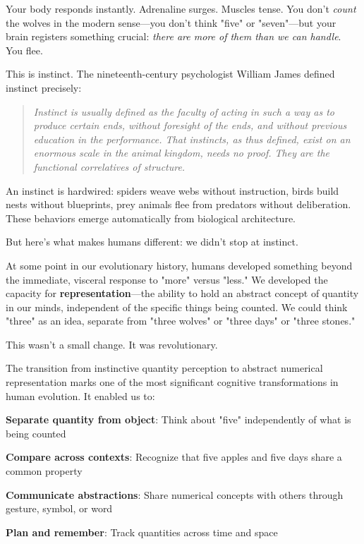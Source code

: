 Your body responds instantly. Adrenaline surges. Muscles tense. You don't \textit{count} the wolves in the modern sense—you don't think "five" or "seven"—but your brain registers something crucial: \textit{there are more of them than we can handle}. You flee.

This is instinct. The nineteenth-century psychologist William James defined instinct precisely:

\begin{quote}
	\itshape
	Instinct is usually defined as the faculty of acting in such a way as to produce certain ends, without foresight of the ends, and without previous education in the performance. That instincts, as thus defined, exist on an enormous scale in the animal kingdom, needs no proof. They are the functional correlatives of structure.
\end{quote}

An instinct is hardwired: spiders weave webs without instruction, birds build nests without blueprints, prey animals flee from predators without deliberation. These behaviors emerge automatically from biological architecture.

But here's what makes humans different: we didn't stop at instinct.

At some point in our evolutionary history, humans developed something beyond the immediate, visceral response to "more" versus "less." We developed the capacity for \textbf{representation}—the ability to hold an abstract concept of quantity in our minds, independent of the specific things being counted. We could think "three" as an idea, separate from "three wolves" or "three days" or "three stones."

This wasn't a small change. It was revolutionary.

\begin{keyidea}
	The transition from instinctive quantity perception to abstract numerical representation marks one of the most significant cognitive transformations in human evolution. It enabled us to:
	\begin{compactitem}
		\item \textbf{Separate quantity from object}: Think about "five" independently of what is being counted
		\item \textbf{Compare across contexts}: Recognize that five apples and five days share a common property
		\item \textbf{Communicate abstractions}: Share numerical concepts with others through gesture, symbol, or word
		\item \textbf{Plan and remember}: Track quantities across time and space
	\end{compactitem}
\end{keyidea}

